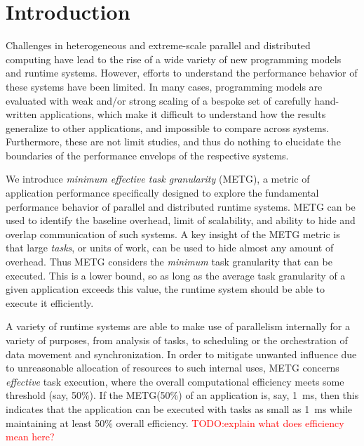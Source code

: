 \section{Introduction}
\label{sec:introduction}

Challenges in heterogeneous and extreme-scale parallel and distributed
computing have lead to the rise of a wide variety of new programming
models and runtime systems. However, efforts to understand the
performance behavior of these systems have been limited. In many cases,
programming models are evaluated with weak and/or strong scaling of a
bespoke set of carefully hand-written applications, which make it
difficult to understand how the results generalize to other
applications, and impossible to compare across systems. Furthermore,
these are not limit studies, and thus do nothing to elucidate the
boundaries of the performance envelops of the respective systems.

We introduce \emph{minimum effective task granularity} (METG), a
metric of application performance specifically designed to explore the
fundamental performance behavior of parallel and distributed runtime
systems. METG can be used to identify the baseline overhead, limit of
scalability, and ability to hide and overlap communication of such
systems. A key insight of the METG metric is that large \emph{tasks},
or units of work, can be used to hide almost any amount of
overhead. Thus METG considers the \emph{minimum} task granularity that
can be executed. This is a lower bound, so as long as the average task
granularity of a given application exceeds this value, the runtime
system should be able to execute it efficiently.

A variety of runtime systems are able to make use of parallelism
internally for a variety of purposes, from analysis of tasks, to
scheduling or the orchestration of data movement and
synchronization. In order to mitigate unwanted influence due to
unreasonable allocation of resources to such internal uses, METG
concerns \emph{effective} task execution, where the overall
computational efficiency meets some threshold (say, 50\%). If the
METG(50\%) of an application is, say, 1~ms, then this indicates that
the application can be executed with tasks as small as 1~ms while
maintaining at least 50\% overall efficiency. 
\textcolor{red}{TODO:explain what does efficiency mean here?}

